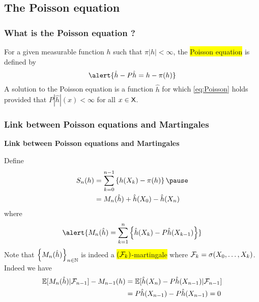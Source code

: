 \documentclass[usenames,dvipsnames]{beamer}
\newcommand\mycoltwo[1]{{\color{blue}#1}}
\newcommand\colbox[1]{\colorbox{Yellow}{#1}}
\begin{document}
\subsection{The Poisson equation}
\begin{frame}
    \frametitle{What is the Poisson equation ?}
    \begin{definition} 
        For a given measurable function $h$ such that $\pi|h|<\infty$, the \colbox{Poisson equation} is defined by
        \begin{equation} \label{eq:Poisson}
        \alert{\hat h - P \hat h=h-\pi(h)}
        \end{equation}
        A solution to the Poisson equation is a function $\hat h$ for which \eqref{eq:Poisson} holds provided that $P|\hat h|(x)<\infty$ for all $x\in\mathsf{X}$.
        
        \end{definition}
\end{frame}
\begin{frame}
    \frametitle{Link between Poisson equations and Martingales}
    \begin{center}
        \mycoltwo{ \bf Link between Poisson equations and Martingales}
    \end{center}Define
    \begin{align*}
        S_n(h)&=\sum_{k=0}^{n-1} \lrcb{h(X_k)-\pi(h)} \pause\\
        &=M_n(\hat h)+\hat h(X_0)-\hat h(X_n)    
    \end{align*}
    \pause
    where
    \begin{equation}\label{eq:def:marting}
    \alert{M_n(\hat h)=\sum_{k=1}^n \lrcb{\hat h(X_k)-P\hat h(X_{k-1})}}
    \end{equation}
    \pause
    Note that $\left\{ M_n(\hat h)\right\}_{n\in\mathbb{N}}$ is indeed a \colbox{$(\mathcal{F}_k)$-martingale} where $\mathcal{F}_k=\sigma(X_0,\ldots,X_k)$. \pause Indeed we have
    \mycoltwo{\begin{align*}
        \mathbb{E}[M_n(\hat h)|\mathcal{F}_{n-1}]-M_{n-1}(h)&=\mathbb{E}[\hat h(X_n)-P\hat h(X_{n-1})|\mathcal{F}_{n-1}]\\
        &=P\hat h(X_{n-1})-P\hat h(X_{n-1})=0
    \end{align*}}
    
    

\end{frame}
\end{document}
